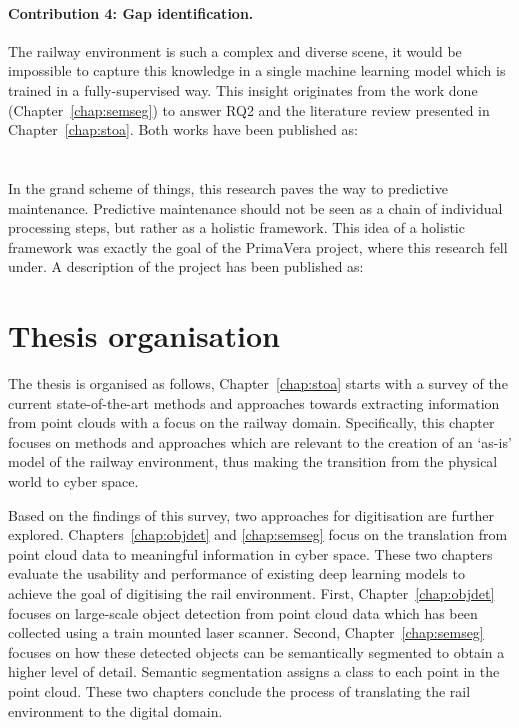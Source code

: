 {\footnotesize
\noindent{}
}

\paragraph{Contribution 4: Gap identification.}
The railway environment is such a complex and diverse scene, it would be impossible to capture this knowledge in a single machine learning model which is trained in a fully-supervised way. This insight originates from the work done (Chapter~\ref{chap:semseg}) to answer RQ2 and the literature review presented in Chapter~\ref{chap:stoa}. Both works have been published as:\\

{\footnotesize
\noindent{}\\[1.5\normalbaselineskip]
\noindent{}
}\\

In the grand scheme of things, this research paves the way to predictive maintenance. Predictive maintenance should not be seen as a chain of individual processing steps, but rather as a holistic framework. This idea of a holistic framework was exactly the goal of the PrimaVera project, where this research fell under. A description of the project has been published as:\\

{\footnotesize
\noindent{}
}
 

\section{Thesis organisation}
The thesis is organised as follows, Chapter~\ref{chap:stoa} starts with a survey of the current state-of-the-art methods and approaches towards extracting information from point clouds with a focus on the railway domain. Specifically, this chapter focuses on methods and approaches which are relevant to the creation of an `as-is' model of the railway environment, thus making the transition from the physical world to cyber space.

Based on the findings of this survey, two approaches for digitisation are further explored. Chapters~\ref{chap:objdet} and \ref{chap:semseg} focus on the translation from point cloud data to meaningful information in cyber space. These two chapters evaluate the usability and performance of existing deep learning models to achieve the goal of digitising the rail environment. First, Chapter~\ref{chap:objdet} focuses on large-scale object detection from point cloud data which has been collected using a train mounted laser scanner. Second, Chapter~\ref{chap:semseg} focuses on how these detected objects can be semantically segmented to obtain a higher level of detail. Semantic segmentation assigns a class to each point in the point cloud. These two chapters conclude the process of translating the rail environment to the digital domain.

